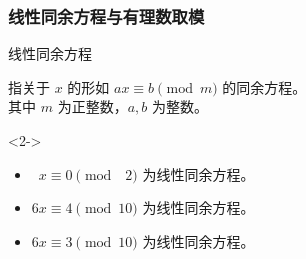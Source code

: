 \documentclass{../pkslide}
\begin{document}

\subsubsection{线性同余方程与有理数取模}


\begin{frame}{线性同余方程}
  \begin{definition}
    指关于 $x$ 的形如 $a x \equiv b \pmod{m}$ 的同余方程。\\
    其中 $m$ 为正整数，$a, b$ 为整数。
  \end{definition}
  
  \begin{visibleenv}<2->
    \begin{examples}[线性同余方程]
      \begin{itemize}
        \item $\phantom{1}x \equiv 0 \pmod{\phantom{0}2}$ 为线性同余方程。
        \item $6 x \equiv 4 \pmod{10}$ 为线性同余方程。
        \item $6 x \equiv 3 \pmod{10}$ 为线性同余方程。
      \end{itemize}
    \end{examples}
  \end{visibleenv}
\end{frame}
\end{document}
